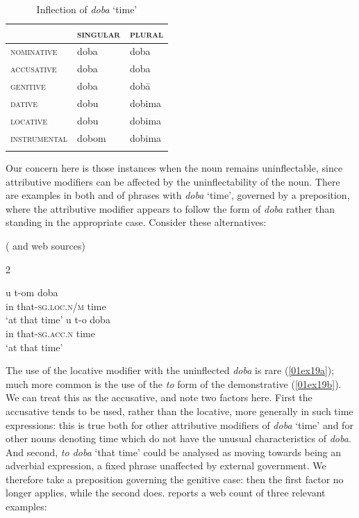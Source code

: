 \documentclass[output=paper,colorlinks,citecolor=brown]{langscibook}
\begin{document}
\begin{table}[ht]
	\centering
	\caption{Inflection of  \textit{doba} ‘time’ \citep[79]{benson1971}}
	\label{01tab18}
	\begin{tabularx}{0.6\textwidth}{lXX}
		\lsptoprule
		& \textsc{singular} & \textsc{plural} \\
		\midrule
		\textsc{nominative} & doba & doba \\
		\textsc{accusative} & doba & doba \\
		\textsc{genitive} & doba & dobā \\
		\textsc{dative} & dobu & dobima \\
		\textsc{locative} & dobu & dobima \\
		\textsc{instrumental} & dobom & dobima \\
		\lspbottomrule
	\end{tabularx}
\end{table}

Our concern here is those instances when the noun remains uninflectable, since attributive modifiers can be affected by the uninflectability of the noun. There are examples in both \citet{kovacevic1951} and \citet{stevanovic1975} of phrases with \textit{doba} `time', governed by a preposition, where the attributive modifier appears to follow the form of \textit{doba} rather than standing in the appropriate case. Consider these alternatives:

\begin{exe}
	\ex  {} (\citealt{kovacevic1951} and web sources) \vspace*{-0.3cm}
	\begin{multicols}{2}
	\begin{xlist}
		\ex \label{01ex19a}
		\gll u	t-om	doba \\
		in	that-\textsc{sg.loc.n/m} time \\
		\trans ‘at that time’
		\ex \label{01ex19b}
		\gll u	t-o	doba \\
		in	that-\textsc{sg.acc.n}	time \\
		\trans ‘at that time’
	\end{xlist}
	\end{multicols}
\end{exe}

The use of the locative modifier with the uninflected \textit{doba} is rare (\ref{01ex19a}); much more common is the use of the \textit{to} form of the demonstrative (\ref{01ex19b}). We can treat this as the accusative, and note two factors here. First the accusative tends to be used, rather than the locative, more generally in such time expressions: this is true both for other attributive modifiers of \textit{doba} `time' \citep[11--13]{browne2015} and for other nouns denoting time which do not have the unusual characteristics of \textit{doba}. And second, \textit{to doba} `that time' could be analysed as moving towards being an adverbial expression, a fixed phrase unaffected by external government. We therefore take a preposition governing the genitive case: then the first factor no longer applies, while the second does. \citet{browne2015} reports a web count of three relevant examples:
\end{document}
